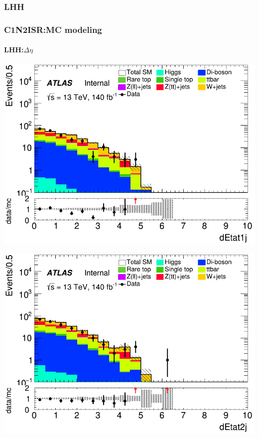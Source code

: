 \documentclass[usenames,dvipsnames]{beamer}
\begin{document}
\subsubsection{LHH}
\begin{frame}
\frametitle{C1N2ISR:MC modeling}
\framesubtitle{LHH:\quad $\Delta\eta$}
    \begin{minipage}{0.32\textwidth}
        \centering
        \includegraphics[width=\textwidth]{graphics/LHH_met/LHH_met_dEtat1j.png}
    \end{minipage}
    \hfill
    \begin{minipage}{0.32\textwidth}
        \centering
        \includegraphics[width=\textwidth]{graphics/LHH_met/LHH_met_dEtat2j.png}
    \end{minipage}
    \hfill

\end{frame}
\end{document}
